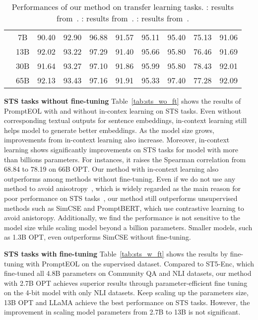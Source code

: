 \documentclass{article}
\begin{document}
\begin{table*}[t]
{\begin{tabular}{lccccccccc}
& 7B & 90.40 & 92.90 & 96.88 & 91.57 & 95.11 & 95.40 & 75.13 & 91.06 \\
& 13B & 92.02 & 93.22 & 97.29 & 91.40 & 95.66 & 95.80 & 76.46 & 91.69 \\
& 30B & 91.64 & 93.27 & 97.10 & 91.86 & 95.99 & 95.80 & 78.43 & 92.01 \\
& 65B\cellcolor{lightcyan} & 92.13\cellcolor{lightcyan} & 93.43\cellcolor{lightcyan} & 97.16\cellcolor{lightcyan} & 91.91\cellcolor{lightcyan} & 95.33\cellcolor{lightcyan} & 97.40\cellcolor{lightcyan} & 77.28\cellcolor{lightcyan} & 92.09\cellcolor{lightcyan} \\
\bottomrule
\end{tabular}}
\caption{ Performances of our method on transfer learning tasks.
  : results from~\cite{gao2021simcse}.
  : results from~\cite{jiang2022promptbert}.
  : results from~\cite{sentencet5}.
}\label{tab:tran_w_ft}
\vspace{-15pt}
\end{table*}

\textbf{STS tasks without fine-tuning}
Table~\ref{tab:sts_wo_ft} shows the results of PromptEOL with and without in-contex learning on STS tasks.
Even without corresponding textual outputs for sentence embeddings, in-context learning still helps model to generate better embeddings.
As the model size grows, improvements from in-context learning also increase.
Moreover, in-context learning shows significantly improvements on STS tasks for model with more than billions parameters.
For instances, it raises the Spearman correlation from 68.84 to 78.19 on 66B OPT.
Our method with in-context learning also outperforms among methods without fine-tuning.
Even if we do not use any method to avoid anisotropy~\cite{ethayarajh2019contextual}, which is widely regarded as the main reason for poor performance on STS tasks~\cite{gao2021simcse, sentencet5}, our method still outperforms unsupervised methods such as SimCSE and PromptBERT, which use contrastive learning to avoid anistoropy.
Additionally, we find the performance is not sensitive to the model size while scaling model beyond a billion parameters.
Smaller models, such as 1.3B OPT, even outperforms SimCSE without fine-tuning.

\textbf{STS tasks with fine-tuning}
Table~\ref{tab:sts_w_ft} shows the results by fine-tuning with PromptEOL on the supervised dataset.
Compared to ST5-Enc, which fine-tuned all 4.8B parameters on Community QA and NLI datasets,
our method with 2.7B OPT achieves superior results through parameter-efficient fine tuning on the 4-bit model with only NLI datasets.
Keep scaling up the parameters size, 13B OPT and LLaMA achieve the best performance on STS tasks.
However, the improvement in scaling model parameters from 2.7B to 13B is not significant.
\end{document}
